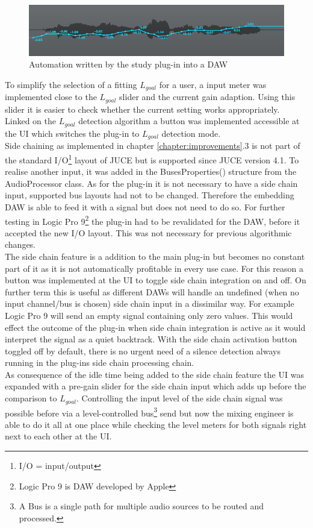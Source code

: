 \begin{figure}[H]
\includegraphics[width=\textwidth]{images/automation}
\caption{Automation written by the study plug-in into a DAW}
\label{auto}
\end{figure}

To simplify the selection of a fitting $L_{goal}$ for a user, a input meter was implemented close to the $L_{goal}$ slider and the current gain adaption. Using this slider it is easier to check whether the current setting works appropriately.\\
Linked on the $L_{goal}$ detection algorithm a button was implemented accessible at the UI which switches the plug-in to $L_{goal}$ detection mode.\\
Side chaining as implemented in chapter \ref{chapter:improvements}.3 is not part of the standard I/O\footnote{I/O = input/output} layout of JUCE but is supported since JUCE version 4.1. To realise another input, it was added in the BusesProperties() structure from the AudioProcessor class. As for the plug-in it is not necessary to have a side chain input, supported bus layouts had not to be changed. Therefore the embedding DAW is able to feed it with a signal but does not need to do so. For further testing in Logic Pro 9\footnote{Logic Pro 9 is DAW developed by Apple} the plug-in had to be revalidated for the DAW, before it accepted the new I/O layout. This was not necessary for previous algorithmic changes.\\
The side chain feature is a addition to the main plug-in but becomes no constant part of it as it is not automatically profitable in every use case. For this reason a button was implemented at the UI to toggle side chain integration on and off. On further term this is useful as different DAWs will handle an undefined (when no input channel/bus is chosen) side chain input in a dissimilar way. For example Logic Pro 9 will send an empty signal containing only zero values. This would effect the outcome of the plug-in when side chain integration is active as it would interpret the signal as a quiet backtrack. With the side chain activation button toggled off by default, there is no urgent need of a silence detection always running in the plug-ins side chain processing chain.\\
As consequence of the idle time being added to the side chain feature the UI was expanded with a pre-gain slider for the side chain input which adds up before the comparison to $L_{goal}$. Controlling the input level of the side chain signal was possible before via a level-controlled bus\footnote{A Bus is a single path for multiple audio sources to be routed and processed.} send but now the mixing engineer is able to do it all at one place while checking the level meters for both signals right next to each other at the UI. 

